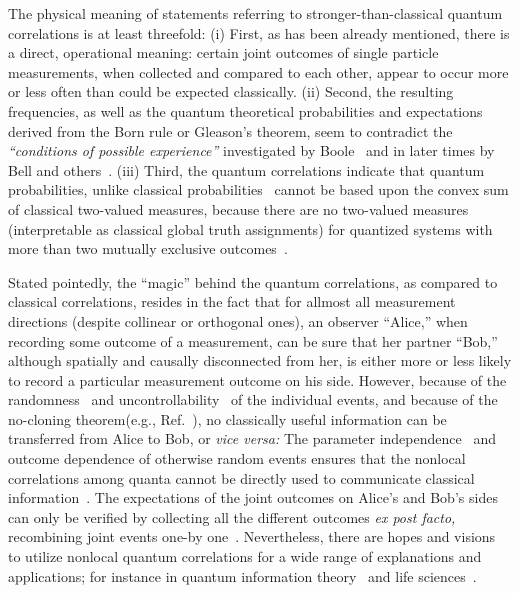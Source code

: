 \documentclass[pra,amsfonts,showpacs,showkeys,preprint]{revtex4}
\begin{document}
The physical meaning of statements referring to stronger-than-classical quantum correlations is at least threefold:
(i) First, as has been already mentioned, there is a direct, operational meaning:
certain joint outcomes of single particle measurements, when collected and compared to each other,
appear to occur more or less often than could be expected classically.
(ii) Second, the resulting frequencies, as well as the quantum theoretical probabilities and expectations derived from the Born rule or Gleason's theorem,
seem to contradict the {\em ``conditions of possible experience''} investigated by Boole~\cite{Boole,Boole-62} and in later times by
Bell and others~\cite{bell,Pit-94,2000-poly}.
(iii) Third, the quantum correlations indicate that quantum probabilities, unlike classical probabilities~\cite{pitowsky,svozil-2008-ql}
cannot be based upon the convex sum of classical two-valued measures,
because there are no two-valued measures (interpretable as classical global truth assignments) for quantized systems
with more than two mutually exclusive outcomes~\cite{specker-60,kochen1,ZirlSchl-65,Alda,Alda2,kamber64,kamber65,svozil-tkadlec,cabello-96}.


Stated pointedly, the ``magic'' behind the quantum correlations, as compared to classical correlations, resides in the fact that
for allmost all measurement directions (despite collinear or orthogonal ones), an observer ``Alice,''
when recording some outcome of a measurement, can be sure that her partner ``Bob,''
although spatially and causally disconnected from her, is either more or less likely to record a particular measurement outcome on his side.
However, because of the randomness~\cite{svozil-qct} and uncontrollability~\cite{svozil-slash} of the individual events, and
because of the no-cloning theorem(e.g., Ref.~\cite[pp.~39-40]{mermin-07}),
no classically useful information can be transferred from Alice to Bob, or {\it vice versa:}
The parameter independence~\cite{clauser,shimony3} and outcome dependence of otherwise random events ensures that
the nonlocal correlations among quanta cannot be directly used to communicate classical information~\cite{pop-rohr,grunhaus-96}.
The expectations of the joint outcomes on Alice's and Bob's sides can only be  verified by collecting all the different outcomes {\it ex post facto,}
recombining joint events one-by one~\cite{Gill-Larss-04}.
Nevertheless, there are hopes and visions to utilize nonlocal quantum correlations for a wide range of explanations and
applications; for instance in quantum information theory~\cite{bruk-06} and life sciences~\cite{sum-05}.
\end{document}
